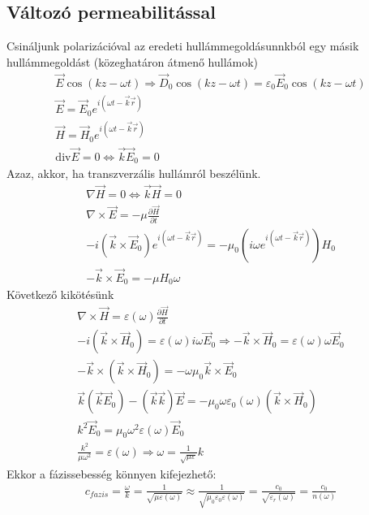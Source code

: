 \documentclass{article}
\begin{document}
\subsection{Változó permeabilitással}
Csináljunk polarizációval az eredeti hullámmegoldásunnkból egy másik hullámmegoldást (közeghatáron átmenő hullámok)
\begin{gather*}
\vec{E}\cos(kz- \omega t ) \Rightarrow \vec{D}_0 \cos(kz-\omega t) = \varepsilon_0 \vec{E}_0 \cos(kz-\omega t) \\
\vec{E} = \vec{E}_0 e^{i(\omega t -\vec{k} \vec{r})} \\
\vec{H} = \vec{H}_0 e^{i(\omega t- \vec{k} \vec{r})} \\
\mathrm{div} \vec{E} = 0 \Leftrightarrow \vec{k} \vec{E}_0 = 0
\end{gather*}
Azaz, akkor, ha transzverzális hullámról beszélünk.
\begin{gather*}
\nabla \vec{H} = 0	\Leftrightarrow \vec{k} \vec{H} = 0\\
\nabla \times \vec{E} = -\mu \frac{\partial \vec{H}}{\partial t} \\
-i(\vec{k} \times \vec{E}_0)e^{i(\omega t -\vec{k}\vec{r})} = -\mu_0(i\omega e^{i(\omega t - \vec{k} \vec{r})}) H_0 \\
-\vec{k} \times \vec{E}_0 = -\mu H_0 \omega
\end{gather*}
Következő kikötésünk
\begin{gather*}
\nabla \times \vec{H} = \varepsilon(\omega) \frac{\partial \vec{H}}{\partial t} \\
-i(\vec{k} \times \vec{H}_0) = \varepsilon(\omega) i \omega \vec{E}_0 \Rightarrow -\vec{k} \times \vec{H}_0 = \varepsilon(\omega) \omega \vec{E}_0 \\
-\vec{k} \times (\vec{k} \times \vec{H}_0) = -\omega \mu_0 \vec{k} \times \vec{E}_0 \\
\vec{k} (\vec{k}\vec{E}_0) - (\vec{k}\vec{k}) \vec{E} = -\mu_0 \omega \varepsilon_0(\omega) (\vec{k} \times \vec{H}_0) \\
k^2 \vec{E}_0 = \mu_0 \omega^2 \varepsilon(\omega) \vec{E}_0 \\
\frac{k^2}{\mu \omega^2} = \varepsilon(\omega)  \Rightarrow \omega = \frac{1}{\sqrt{\mu \varepsilon}}k
\end{gather*}
Ekkor a fázissebesség könnyen kifejezhető:
\begin{align*}
c_{fazis} = \frac{\omega}{k} = \frac{1}{\sqrt{\mu \varepsilon(\omega)}} \approx \frac{1}{\sqrt{\mu_0 \varepsilon_0 \varepsilon(\omega)}} = \frac{c_0}{\sqrt{\varepsilon_r(\omega)}} = \frac{c_0}{n(\omega)}
\end{align*}
\end{document}
